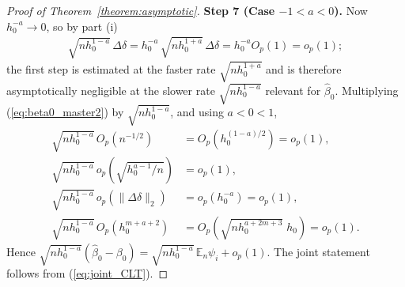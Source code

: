 \documentclass{article}
\newcommand{\normm}[1]{\lVert#1\rVert}
\newcommand{\E}{\mathbb{E}}
\begin{document}
\begin{appendices}
\begin{proof}[Proof of Theorem~\ref{theorem:asymptotic}]
\textbf{Step 7 (Case $-1<a<0$).}
Now $h_0^{-a}\to0$, so by part (i)
\begin{align*}
    \sqrt{nh_0^{1-a}}\,\Delta\delta
    = h_0^{-a}\,\sqrt{nh_0^{1+a}}\,\Delta\delta
    = h_0^{-a}O_p(1)=o_p(1);
\end{align*}
the first step is estimated at the faster rate $\sqrt{nh_0^{1+a}}$ and is
therefore asymptotically negligible at the slower rate $\sqrt{nh_0^{1-a}}$
relevant for $\hat\beta_0$. Multiplying (\ref{eq:beta0_master2}) by
$\sqrt{nh_0^{1-a}}$, and using $a<0<1$,
\begin{align*}
    \sqrt{nh_0^{1-a}}\,O_p\!\left(n^{-1/2}\right)&=O_p\!\left(h_0^{(1-a)/2}\right)=o_p(1),\\
    \sqrt{nh_0^{1-a}}\,o_p\!\left(\sqrt{h_0^{a-1}/n}\right)&=o_p(1),\\
    \sqrt{nh_0^{1-a}}\,o_p\!\left(\normm{\Delta\delta}_2\right)&=o_p\!\left(h_0^{-a}\right)=o_p(1),\\
    \sqrt{nh_0^{1-a}}\,O_p\!\left(h_0^{m+a+2}\right)
    &=O_p\!\left(\sqrt{nh_0^{a+2m+3}}\;h_0\right)=o_p(1).
\end{align*}
Hence $\sqrt{nh_0^{1-a}}(\hat\beta_0-\beta_0)=\sqrt{nh_0^{1-a}}\,\E_n\psi_i+o_p(1)$. The joint
statement follows from (\ref{eq:joint_CLT}).

\end{proof}

\end{appendices}
\newpage
% 


\end{document}
